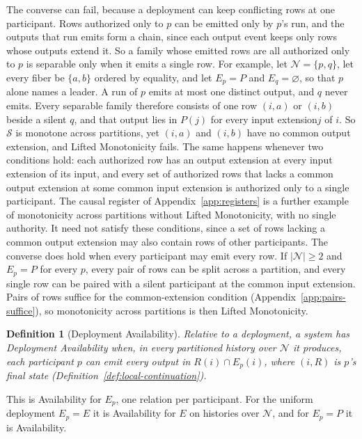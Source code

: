 \documentclass[sigconf]{cidr-2027}
\newtheorem{definition}{Definition}
\theoremstyle{remark}
\newcommand{\indesc}{input extension\xspace} %
\newcommand{\outnoun}{output extension\xspace}%
\newcommand{\Spec}{\mathcal{S}}
\newcommand{\fiber}[1]{P(#1)}
\begin{document}
\color{blue!70!black}The converse can fail, because a deployment can keep conflicting rows at one
participant.  Rows authorized only to $p$ can be emitted only by $p$'s run, and
the outputs that run emits form a chain, since each output event keeps only
rows whose outputs extend it.  So a family whose emitted rows are all
authorized only to $p$ is separable only when it emits a single row.  For
example, let $\mathcal N=\{p,q\}$, let every fiber be $\{a,b\}$ ordered by
equality, and let $E_p=P$ and $E_q=\varnothing$, so that $p$ alone names a
leader.  A run of $p$ emits at most one distinct output, and $q$ never emits.
Every separable family therefore consists of one row $(i,a)$ or $(i,b)$ beside
a silent $q$, and that output lies in $\fiber{j}$ for every \indesc $j$ of $i$.
So $\Spec$ is monotone across partitions, yet $(i,a)$ and $(i,b)$ have no
common \outnoun, and Lifted Monotonicity fails.  The same happens whenever two
conditions hold: each authorized row has an \outnoun at every \indesc of its
input, and every set of authorized rows that lacks a common \outnoun at some
common \indesc is authorized only to a single participant.  The causal register
of Appendix~\ref{app:registers} is a further example of monotonicity across
partitions without Lifted Monotonicity, with no single authority.  It need not
satisfy these conditions, since a set of rows lacking a common \outnoun may also
contain rows of other participants.  The converse does hold when every
participant may emit every row.  If $|\mathcal N|\ge2$ and $E_p=P$ for every
$p$, every pair of rows can be split across a partition, and every single row
can be paired with a silent participant at the common \indesc.  Pairs of rows
suffice for the common-extension condition (Appendix~\ref{app:pairs-suffice}),
so monotonicity across partitions is then Lifted Monotonicity.\color{black}

\color{blue!70!black}\begin{definition}[Deployment Availability]
\label{def:deployment-availability}
Relative to a deployment, a system has \emph{Deployment Availability} when, in
every partitioned history over $\mathcal N$ it produces, each participant $p$
can emit every output in $R(i)\cap E_p(i)$, where $(i,R)$ is $p$'s final state
(Definition~\ref{def:local-continuation}).\color{black}
\end{definition}

\color{blue!70!black}This is Availability for $E_p$, one relation per participant.  For the uniform
deployment $E_p=E$ it is Availability for $E$ on histories over $\mathcal N$, and for
$E_p=P$ it is Availability.\color{black}
\end{document}

